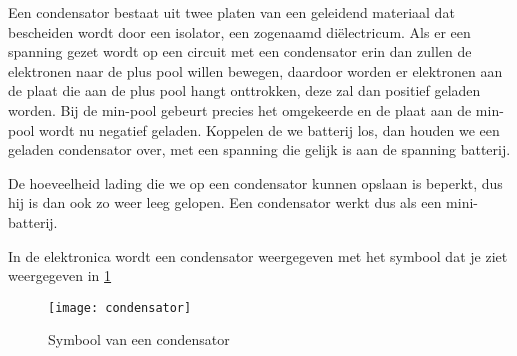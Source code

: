 Een condensator bestaat uit twee platen van een geleidend materiaal dat bescheiden wordt door een isolator, een zogenaamd di\"electricum. Als er een spanning gezet wordt op een circuit met een condensator erin dan zullen de elektronen naar de plus pool willen bewegen, daardoor worden er elektronen aan de plaat die aan de plus pool hangt onttrokken, deze zal dan positief geladen worden. Bij de min-pool gebeurt precies het omgekeerde en de plaat aan de min-pool wordt nu negatief geladen. Koppelen de we batterij los, dan houden we een geladen condensator over, met een spanning die gelijk is aan de spanning batterij.

De hoeveelheid lading die we op een condensator kunnen opslaan is beperkt, dus hij is dan ook zo weer leeg gelopen. Een condensator werkt dus als een mini-batterij.

In de elektronica wordt een condensator weergegeven met het symbool dat je ziet weergegeven in \ref{symbool:condensator}

\begin{figure}[h]
\texttt{[image: condensator]}
\centering
\caption{Symbool van een condensator}
\label{symbool:condensator}
\end{figure}

